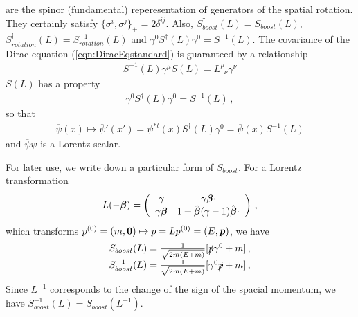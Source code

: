 are the spinor (fundamental) reperesentation of generators of the spatial rotation.
They certainly satisfy $\{ \sigma^i, \sigma^j \}_+ = 2 \delta^{ij}$. Also,
$S^\dagger_{boost}(L) = S_{boost}(L)$,
$S^\dagger_{rotation}(L) = S^{-1}_{rotation}(L)$ and
$\gamma^0 S^\dagger_{}(L) \gamma^0 = S^{-1}_{}(L)$.
The covariance of the Dirac equation (\ref{eqn:DiracEqstandard}) is guaranteed by
a relationship
\begin{eqnarray}
S^{-1}(L) \gamma^\mu S(L) = L^\mu_{\;\;\nu} \gamma^\nu
\label{eqn:LorentzTransfgammaApp}
\end{eqnarray}
$S(L)$ has a property
\begin{eqnarray}
\gamma^0 S^\dagger(L) \gamma^0 = S^{-1}(L)\,,
\end{eqnarray}
so that
\begin{eqnarray}
\overline{\psi}(x) \mapsto {\overline{\psi}}'(x') = \psi^{*t} (x) S^\dagger(L) \gamma^0
= \overline{\psi}(x) S^{-1}(L)
\end{eqnarray}
and $\overline{\psi} \psi$ is a Lorentz scalar.

For later use, we write down a particular form of $S_{boost}$.
For a Lorentz transformation
\begin{eqnarray}
L(-\mbox{\boldmath $\beta$}) = \left(
\begin{array}{cc}
\gamma &
 \gamma \mbox{\boldmath $\beta$} \cdot
\\
\gamma  \mbox{\boldmath $\beta$} &
1 + \hat{\mbox{\boldmath $\beta$}} (\gamma - 1) \hat{\mbox{\boldmath $\beta$}} \cdot
\end{array}
\right)\,,
\end{eqnarray}
which transforms $p^{(0)}= (m, \mbox{\boldmath $0$}) \mapsto p = L p^{(0)} = (E, \mbox{\boldmath $p$})$,
we have
\begin{eqnarray}
\begin{array}{l}
S_{boost}(L)
=
\frac{1}{\sqrt{2m(E + m)}}
[ \slashed{p} \gamma^0 + m ]\,,
\\
S_{boost}^{-1}(L)
=
\frac{1}{\sqrt{2m(E + m)}}
[ \gamma^0 \slashed{p}  + m ]\,,
\end{array}
\end{eqnarray}
Since $L^{-1}$ corresponds to the change of the sign of the spacial momentum,
we have $S_{boost}^{-1}(L) = S_{boost}(L^{-1})$.


